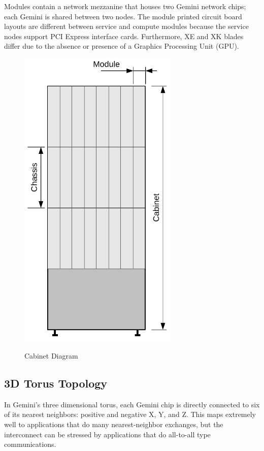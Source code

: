 \documentclass[10pt, conference, compsocconf]{IEEEtran}
\begin{document}
Modules contain a network mezzanine that houses two Gemini network chips; each
Gemini is shared between two nodes.  The module printed circuit board layouts
are different between service and compute modules because the service nodes
support PCI Express interface cards.  Furthermore, XE and XK blades differ due
to the absence or presence of a Graphics Processing Unit (GPU).

\begin{figure}
  \centering
  \includegraphics[width=3.0in]{figures/cabinet_diagram.pdf}\\
  \caption{Cabinet Diagram}\label{fig:cab}
\end{figure}

\subsection{3D Torus Topology}

\label{sec:torustopo}
In Gemini's three dimensional torus, each Gemini chip is directly connected to
six of its nearest neighbors: positive and negative X, Y, and Z.  This maps
extremely well to applications that do many nearest-neighbor exchanges, but the
interconnect can be stressed by applications that do all-to-all type
communications.
\end{document}
